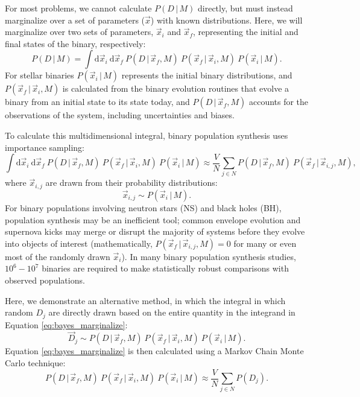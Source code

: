 \documentclass[12pt, preprint]{aastex}
\newcommand{\given}{\,|\,}
\newcommand{\dd}{\mathrm{d}}
\begin{document}
For most problems, we cannot calculate $P(D \given M)$ directly, but must instead marginalize over a set of parameters ($\vec{x}$) with known distributions. Here, we will marginalize over two sets of parameters, $\vec{x}_i$ and $\vec{x}_f$, representing the initial and final states of the binary, respectively:
\begin{equation}
P(D \given M) = \int \dd \vec{x}_i\ \dd \vec{x}_f\ P(D \given \vec{x}_f, M)\ P(\vec{x}_f \given \vec{x}_i, M)\ P(\vec{x}_i \given M). \label{eq:bayes_marginalize}
\end{equation}
For stellar binaries $P(\vec{x}_i \given M)$ represents the initial binary distributions, and $P(\vec{x}_f \given \vec{x}_i, M)$ is calculated from the binary evolution routines that evolve a binary from an initial state to its state today, and $P(D \given \vec{x}_f, M)$ accounts for the observations of the system, including uncertainties and biases.

To calculate this multidimensional integral, binary population synthesis uses importance sampling:
\begin{equation}
\int \dd \vec{x}_i\ \dd \vec{x}_f\ P(D \given \vec{x}_f, M)\ P(\vec{x}_f \given \vec{x}_i, M)\ P(\vec{x}_i \given M) \approx \frac{V}{N} \sum_{j \in N} P(D \given \vec{x}_f, M)\ P(\vec{x}_f \given \vec{x}_{i,j}, M), \label{eq:pop_synth}
\end{equation}
where $\vec{x}_{i,j}$ are drawn from their probability distributions:
\begin{equation}
\vec{x}_{i,j} \sim P(\vec{x}_i \given M).
\end{equation}
For binary populations involving neutron stars (NS) and black holes (BH), population synthesis may be an inefficient tool; common envelope evolution and supernova kicks may merge or disrupt the majority of systems before they evolve into objects of interest (mathematically, $P(\vec{x}_f \given \vec{x}_{i,j}, M) = 0$ for many or even most of the randomly drawn $\vec{x}_i$). In many binary population synthesis studies, $10^6-10^7$ binaries are required to make statistically robust comparisons with observed populations.

Here, we demonstrate an alternative method, in which the integral in which random $D_j$ are directly drawn based on the entire quantity in the integrand in Equation \ref{eq:bayes_marginalize}:
\begin{equation}
\vec{D}_j \sim P(D \given \vec{x}_f, M)\ P(\vec{x}_f \given \vec{x}_i, M)\ P(\vec{x}_i \given M). 
\end{equation}
Equation \ref{eq:bayes_marginalize} is then calculated using a Markov Chain Monte Carlo technique:
\begin{equation}
P(D \given \vec{x}_f, M)\ P(\vec{x}_f \given \vec{x}_i, M)\ P(\vec{x}_i \given M) \approx \frac{V}{N} \sum_{j \in N} P(D_j). \label{eq:MCMC}
\end{equation}
\end{document}
